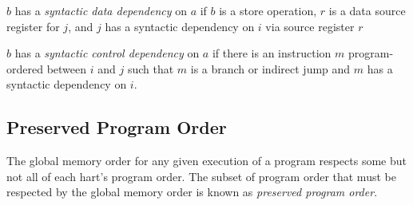 $b$ has a {\em syntactic data dependency} on $a$ if $b$ is a store operation, $r$ is a data source register for $j$, and $j$ has a syntactic dependency on $i$ via source register $r$

$b$ has a {\em syntactic control dependency} on $a$ if there is an instruction $m$ program-ordered between $i$ and $j$ such that $m$ is a branch or indirect jump and $m$ has a syntactic dependency on $i$.

\subsection*{Preserved Program Order}
The global memory order for any given execution of a program respects some but not all of each hart's program order.
The subset of program order that must be respected by the global memory order is known as {\em preserved program order}.

\newcommand{\ppost}{$b$ is a store, and $a$ and $b$ access overlapping memory addresses}
\newcommand{\ppofence}{There is a FENCE instruction that orders $a$ before $b$}
\newcommand{\ppoacquire}{$a$ has an acquire annotation}
\newcommand{\pporelease}{$b$ has a release annotation}
\newcommand{\pporcsc}{$a$ and $b$ both have RCsc annotations}
\newcommand{\ppoamoforward}{$a$ is generated by an AMO or SC instruction, $b$ is a load, and $b$ returns a value written by $a$}
\newcommand{\ppoaddr}{$b$ has a syntactic address dependency on $a$}
\newcommand{\ppodata}{$b$ has a syntactic data dependency on $a$}
\newcommand{\ppoctrl}{$b$ is a store, and $b$ has a syntactic control dependency on $a$}
\newcommand{\ppopair}{$a$ is paired with $b$}
\newcommand{\ppordw}{$a$ and $b$ are loads, $x$ is a byte read by both $a$ and $b$, there is no store to $x$ between $a$ and $b$ in program order, and $a$ and $b$ return values for $x$ written by different memory operations}
\newcommand{\ppoaddrdatarfi}{$b$ is a load, and there exists some store $m$ between $a$ and $b$ in program order such that $m$ has an address or data dependency on $a$, and $b$ returns a value written by $m$}
\newcommand{\ppoaddrpo}{$b$ is a store, and there exists some instruction $m$ between $a$ and $b$ in program order such that $m$ has an address dependency on $a$}

